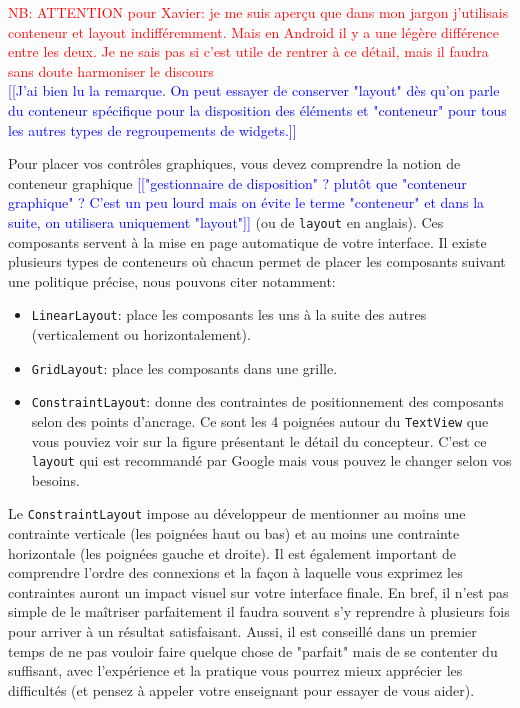 \documentclass[a4paper,10pt]{article}
\begin{document}
\textcolor{red}{NB: ATTENTION pour Xavier: je me suis aperçu que dans mon jargon j'utilisais conteneur et layout indifféremment. Mais en Android il y a une légère différence entre les deux. Je ne sais pas si c'est utile de rentrer à ce détail, mais il faudra sans doute harmoniser le discours }\\
\textcolor{blue}{[[J'ai bien lu la remarque. On peut essayer de conserver "layout" dès qu'on parle du conteneur spécifique pour la disposition des éléments et "conteneur" pour tous les autres types de regroupements de widgets.]]}

Pour placer vos contrôles graphiques, vous devez comprendre la notion de conteneur graphique \textcolor{blue}{[["gestionnaire de disposition" ? plutôt que "conteneur graphique" ? C'est un peu lourd mais on évite le terme "conteneur" et dans la suite, on utilisera uniquement "layout"]]} (ou de \texttt{layout} en anglais). Ces composants servent à la mise en page automatique de votre interface. Il existe plusieurs types de conteneurs où chacun permet de placer les composants suivant une politique précise, nous pouvons citer notamment:
\begin{itemize}
	\item \texttt{LinearLayout}: place les composants les uns à la suite des autres (verticalement ou horizontalement).
	\item \texttt{GridLayout}: place les composants dans une grille.
	\item \texttt{ConstraintLayout}: donne des contraintes de positionnement des composants selon des points d'ancrage. Ce sont les 4 poignées autour du \texttt{TextView} que vous pouviez voir sur la figure présentant le détail du concepteur. C'est ce \texttt{layout} qui est recommandé par Google mais vous pouvez le changer selon vos besoins.
\end{itemize}

Le \texttt{ConstraintLayout} impose au développeur de mentionner au moins une contrainte verticale (les poignées haut ou bas) et au moins une contrainte horizontale (les poignées gauche et droite). Il est également important de comprendre l'ordre des connexions et la façon à laquelle vous exprimez les contraintes auront un impact visuel sur votre interface finale. En bref, il n'est pas simple de le maîtriser parfaitement il faudra souvent s'y reprendre à plusieurs fois pour arriver à un résultat satisfaisant. Aussi, il est conseillé dans un premier temps de ne pas vouloir faire quelque chose de "parfait" mais de se contenter du suffisant, avec l'expérience et la pratique vous pourrez mieux apprécier les difficultés (et pensez à appeler votre enseignant pour essayer de vous aider).
\end{document}
